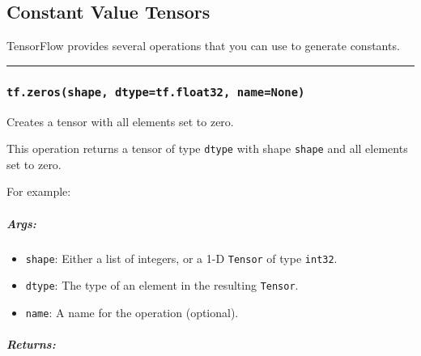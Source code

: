 \subsection{Constant Value Tensors }\label{constant-value-tensors}

TensorFlow provides several operations that you can use to generate
constants.

\begin{center}\rule{0.5\linewidth}{\linethickness}\end{center}

\subsubsection{\texorpdfstring{\texttt{tf.zeros(shape,\ dtype=tf.float32,\ name=None)}
}{tf.zeros(shape, dtype=tf.float32, name=None) }}\label{tf.zerosshape-dtypetf.float32-namenone}

Creates a tensor with all elements set to zero.

This operation returns a tensor of type \texttt{dtype} with shape
\texttt{shape} and all elements set to zero.

For example:

\begin{Shaded}
\begin{Highlighting}[]
\NormalTok{tf.zeros([}\NormalTok{, }\NormalTok{], int32) }\OperatorTok{==>} \NormalTok{[[}\NormalTok{, }\NormalTok{, }\NormalTok{, }\NormalTok{], [}\NormalTok{, }\NormalTok{, }\NormalTok{, }\NormalTok{], [}\NormalTok{, }\NormalTok{, }\NormalTok{, }\NormalTok{]]}
\end{Highlighting}
\end{Shaded}

\subparagraph{Args: }\label{args}

\begin{itemize}
\tightlist
\item
  \texttt{shape}: Either a list of integers, or a 1-D \texttt{Tensor} of
  type \texttt{int32}.
\item
  \texttt{dtype}: The type of an element in the resulting
  \texttt{Tensor}.
\item
  \texttt{name}: A name for the operation (optional).
\end{itemize}

\subparagraph{Returns: }\label{returns}

